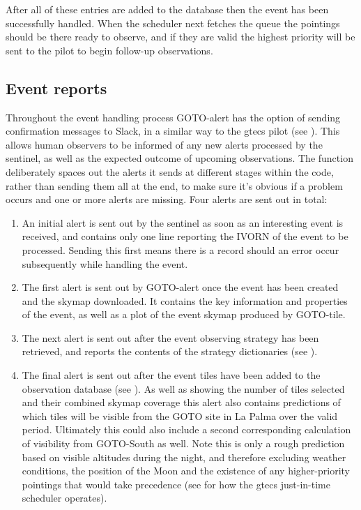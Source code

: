 \begin{colsection}
\begin{colsection}
After all of these entries are added to the database then the event has been successfully handled. When the scheduler next fetches the queue the pointings should be there ready to observe, and if they are valid the highest priority will be sent to the pilot to begin follow-up observations.

\end{colsection}


\newpage
\subsection{Event reports}
\label{sec:event_slack}
\begin{colsection}

Throughout the event handling process GOTO-alert has the option of sending confirmation messages to Slack, in a similar way to the \gls{gtecs} pilot (see ). This allows human observers to be informed of any new alerts processed by the sentinel, as well as the expected outcome of upcoming observations. The function deliberately spaces out the alerts it sends at different stages within the code, rather than sending them all at the end, to make sure it's obvious if a problem occurs and one or more alerts are missing. Four alerts are sent out in total:

\begin{enumerate}
    \item An initial alert is sent out by the sentinel as soon as an interesting event is received, and contains only one line reporting the IVORN of the event to be processed. Sending this first means there is a record should an error occur subsequently while handling the event.
    \item The first alert is sent out by GOTO-alert once the event has been created and the skymap downloaded. It contains the key information and properties of the event, as well as a plot of the event skymap produced by GOTO-tile.
    \item The next alert is sent out after the event observing strategy has been retrieved, and reports the contents of the strategy dictionaries (see ).
    \item The final alert is sent out after the event tiles have been added to the observation database (see ). As well as showing the number of tiles selected and their combined skymap coverage this alert also contains predictions of which tiles will be visible from the GOTO site in La Palma over the valid period. Ultimately this could also include a second corresponding calculation of visibility from GOTO-South as well. Note this is only a rough prediction based on visible altitudes during the night, and therefore excluding weather conditions, the position of the Moon and the existence of any higher-priority pointings that would take precedence (see  for how the \gls{gtecs} just-in-time scheduler operates).
\end{enumerate}


\end{colsection}
\end{colsection}
